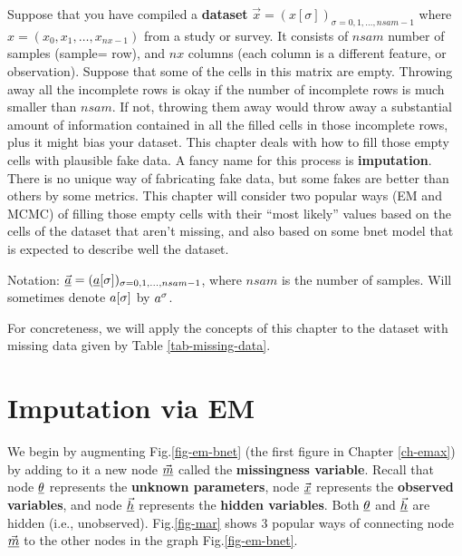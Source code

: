 Suppose that you
have compiled a {\bf dataset}
$\vec{x}=(x[\sigma])_{\sigma=0, 1, \ldots,
nsam-1}$
where $x=(x_0, x_1, \ldots,x_{ nx-1})$
from a study or survey.
It consists 
of $nsam$ number 
of samples (sample= row), 
and $nx$ columns (each column is a different 
feature, or observation).
Suppose that some of the
cells
in this matrix 
are empty.
Throwing
away all the incomplete
rows is okay 
if the 
number
of incomplete rows
is much smaller  than
$nsam$.
If not,
throwing 
them
away would
throw away
a substantial amount of
information 
contained in all the
filled cells
in those incomplete rows, 
plus it might
bias your dataset.
This chapter
deals with
how to fill
those empty cells 
with plausible
fake data.
A fancy name
for this process
is {\bf imputation}.
There is no unique
way of 
fabricating
fake data,
but
some fakes
are
better than others
by some metrics.
This chapter will
consider
two popular
ways (EM
and MCMC)
of 
filling those
empty 
cells
with
their
\enquote{most likely} values
based on the cells
of the dataset that
aren't missing,
and
also based
on some bnet
model
that is 
expected to describe well the
dataset.

Notation:
$\vec{{\underline{a}}}=
({\underline{a}}[\sigma])_{\sigma=0, 1, \ldots,nsam-1}
$, where $nsam$
is the number of samples.
Will
sometimes
denote
$a[\sigma]$ by $a^\sigma$.


For concreteness,
we will
apply
the concepts
of this chapter
to
the dataset
with missing data
given by Table \ref{tab-missing-data}.


\section{Imputation via EM}

We begin by augmenting
Fig.\ref{fig-em-bnet} (the first figure
in Chapter \ref{ch-emax})
by adding to it a new node
$\vec{{\underline{m}}}$
called the
{\bf missingness variable}.
Recall
that node
$\underline{\theta}$
represents
the {\bf unknown parameters},
node $\vec{{\underline{x}}}$
represents the
{\bf observed variables},
and 
node $\vec{{\underline{h}}}$
represents the {\bf hidden
variables}.
Both $\underline{\theta}$
and $\vec{{\underline{h}}}$
are hidden (i.e., unobserved).
Fig.\ref{fig-mar}
shows
3
popular
ways of 
connecting node $\vec{{\underline{m}}}$
 to the
other nodes
in the graph Fig.\ref{fig-em-bnet}.




